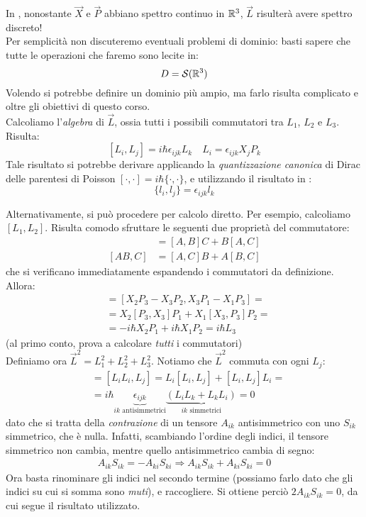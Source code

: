 \documentclass[../../FisicaTeorica.tex]{subfiles}
\begin{document}
In \MQ, nonostante $\vec{X}$ e $\vec{P}$ abbiano spettro continuo in $\mathbb{R}^3$, $\vec{L}$ risulterà avere spettro discreto!\\
Per semplicità non discuteremo eventuali problemi di dominio: basti sapere che tutte le operazioni che faremo sono lecite in:
\[
D=\mathcal{S}(\mathbb{R}^3)
\]
Volendo si potrebbe definire un dominio più ampio, ma farlo risulta complicato e oltre gli obiettivi di questo corso.\\

Calcoliamo l'\textit{algebra} di $\vec{L}$, ossia tutti i possibili commutatori tra $L_1$, $L_2$ e $L_3$. Risulta:
\[
[L_i, L_j] = i\hbar \epsilon_{ijk} L_k \quad L_i = \epsilon_{ijk}X_j P_k
\]
Tale risultato si potrebbe derivare applicando la \textit{quantizzazione canonica} di Dirac delle parentesi di Poisson $[\cdot,\cdot]=i\hbar \{\cdot,\cdot\}$, e utilizzando il risultato in \MC:
\[
\{l_i, l_j\} = \epsilon_{ijk} l_k
\] %

Alternativamente, si può procedere per calcolo diretto. Per esempio, calcoliamo $[L_1, L_2]$. Risulta comodo sfruttare le seguenti due proprietà del commutatore:
\begin{align*}
[A,BC]&=[A,B]C + B[A,C]\\
[AB,C] &= [A,C]B + A[B,C]
\end{align*}
che si verificano immediatamente espandendo i commutatori da definizione.\\

Allora: %
\begin{align*}
[L_1, L_2]&=[X_2 P_3 - X_3 P_2, X_3 P_1 - X_1 P_3]=\\
&=X_2[P_3, X_3] P_1 + X_1[X_3, P_3]P_2=\\
&=-i\hbar X_2 P_1 + i\hbar X_1 P_2 = i\hbar L_3
\end{align*}
(al primo conto, prova a calcolare \textit{tutti} i commutatori)\\

Definiamo ora $\vec{L}^2 = L_1^2 + L_2^2 + L_3^2$. Notiamo che $\vec{L}^2$ commuta con ogni $L_j$:
\begin{align*}
[\vec{L}^2, L_j] &= [L_i L_i, L_j]=L_i[L_i, L_j] + [L_i,L_j]L_i =\\
&=i\hbar\underbrace{ \epsilon_{ijk} }_{ik \text{ antisimmetrici}}\underbrace{(L_i L_k + L_k L_i)}_{ik \text{ simmetrici}} = 0
\end{align*}
dato che si tratta della \textit{contrazione} di un tensore $A_{ik}$ antisimmetrico con uno $S_{ik}$ simmetrico, che è nulla. Infatti, scambiando l'ordine degli indici, il tensore simmetrico non cambia, mentre quello antisimmetrico cambia di segno:
\begin{align*}
A_{ik}S_{ik} =-A_{ki}S_{ki} \Rightarrow A_{ik}S_{ik} + A_{ki}S_{ki} = 0
\end{align*}
Ora basta rinominare gli indici nel secondo termine (possiamo farlo dato che gli indici su cui si somma sono \textit{muti}), e raccogliere. Si ottiene perciò $2A_{ik} S_{ik}=0$, da cui segue il risultato utilizzato.\\
\end{document}
